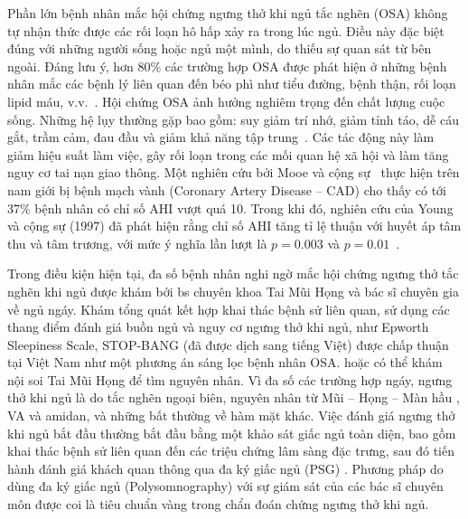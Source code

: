 Phần lớn bệnh nhân mắc hội chứng ngưng thở khi ngủ tắc nghẽn (\gls{OSA}) không
tự nhận thức được các rối loạn hô hấp xảy ra trong lúc ngủ. Điều này đặc biệt
đúng với những người sống hoặc ngủ một mình, do thiếu sự quan sát từ bên ngoài.
Đáng lưu ý, hơn 80\% các trường hợp OSA được phát hiện ở những bệnh nhân mắc
các bệnh lý liên quan đến béo phì như tiểu đường, bệnh thận, rối loạn lipid
máu, v.v.~\cite{wright1997health}. Hội chứng OSA ảnh hưởng nghiêm trọng đến
chất lượng cuộc sống. Những hệ lụy thường gặp bao gồm: suy giảm trí nhớ, giảm
tỉnh táo, dễ cáu gắt, trầm cảm, đau đầu và giảm khả năng tập
trung~\cite{flemons1997quality}. Các tác động này làm giảm hiệu suất làm việc,
gây rối loạn trong các mối quan hệ xã hội và làm tăng nguy cơ tai nạn giao
thông. Một nghiên cứu bởi Mooe và cộng sự~\cite{mooe1996sleep} thực hiện trên
nam giới bị bệnh mạch vành (Coronary Artery Disease – CAD) cho thấy có tới 37\%
bệnh nhân có chỉ số AHI vượt quá 10. Trong khi đó, nghiên cứu của Young và cộng
sự (1997) đã phát hiện rằng chỉ số AHI tăng tỉ lệ thuận với huyết áp tâm thu và
tâm trương, với mức ý nghĩa lần lượt là $p=0.003$ và
$p=0.01$~\cite{young1997population}.

Trong điều kiện hiện tại, đa số bệnh nhân nghi ngờ mắc hội chứng ngưng thở tắc
nghẽn khi ngủ được khám bới bs chuyên khoa Tai Mũi Họng và bác sĩ chuyên gia về
ngủ ngáy. Khám tổng quát kết hợp khai thác bệnh sử liên quan, sử dụng các thang
điểm đánh giá buồn ngủ và nguy cơ ngưng thở khi ngủ, như Epworth Sleepiness
Scale, STOP-BANG (đã được dịch sang tiếng Việt) được chấp thuận tại Việt Nam
như một phương án sáng lọc bệnh nhân OSA. hoặc có thể khám nội soi Tai Mũi Họng
để tìm nguyên nhân. Vì đa số các trường hợp ngáy, ngưng thở khi ngủ là do tắc
nghẽn ngoại biên, nguyên nhân từ Mũi – Họng – Màn hầu , VA và amidan, và những
bất thường về hàm mặt khác. Việc đánh giá ngưng thở khi ngủ bắt đầu thường bắt
đầu bằng một khảo sát giấc ngủ toàn diện, bao gồm khai thác bệnh sử liên quan
đến các triệu chứng lâm sàng đặc trưng, sau đó tiến hành đánh giá khách quan
thông qua đa ký giấc ngủ (PSG)
\cite{diagnosis_osa}\cite{medical2006polysomnography}. Phương pháp do dùng đa
ký giấc ngủ (Polysomnography) với sự giám sát của các bác sĩ chuyên môn được
coi là tiêu chuẩn vàng trong chẩn đoán chứng ngưng thở khi ngủ.

